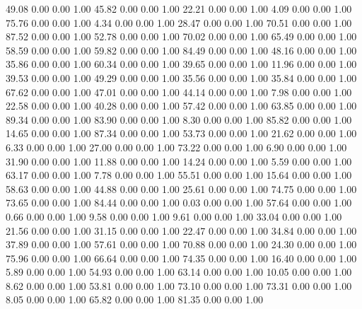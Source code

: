    49.08   0.00   0.00   1.00
   45.82   0.00   0.00   1.00
   22.21   0.00   0.00   1.00
    4.09   0.00   0.00   1.00
   75.76   0.00   0.00   1.00
    4.34   0.00   0.00   1.00
   28.47   0.00   0.00   1.00
   70.51   0.00   0.00   1.00
   87.52   0.00   0.00   1.00
   52.78   0.00   0.00   1.00
   70.02   0.00   0.00   1.00
   65.49   0.00   0.00   1.00
   58.59   0.00   0.00   1.00
   59.82   0.00   0.00   1.00
   84.49   0.00   0.00   1.00
   48.16   0.00   0.00   1.00
   35.86   0.00   0.00   1.00
   60.34   0.00   0.00   1.00
   39.65   0.00   0.00   1.00
   11.96   0.00   0.00   1.00
   39.53   0.00   0.00   1.00
   49.29   0.00   0.00   1.00
   35.56   0.00   0.00   1.00
   35.84   0.00   0.00   1.00
   67.62   0.00   0.00   1.00
   47.01   0.00   0.00   1.00
   44.14   0.00   0.00   1.00
    7.98   0.00   0.00   1.00
   22.58   0.00   0.00   1.00
   40.28   0.00   0.00   1.00
   57.42   0.00   0.00   1.00
   63.85   0.00   0.00   1.00
   89.34   0.00   0.00   1.00
   83.90   0.00   0.00   1.00
    8.30   0.00   0.00   1.00
   85.82   0.00   0.00   1.00
   14.65   0.00   0.00   1.00
   87.34   0.00   0.00   1.00
   53.73   0.00   0.00   1.00
   21.62   0.00   0.00   1.00
    6.33   0.00   0.00   1.00
   27.00   0.00   0.00   1.00
   73.22   0.00   0.00   1.00
    6.90   0.00   0.00   1.00
   31.90   0.00   0.00   1.00
   11.88   0.00   0.00   1.00
   14.24   0.00   0.00   1.00
    5.59   0.00   0.00   1.00
   63.17   0.00   0.00   1.00
    7.78   0.00   0.00   1.00
   55.51   0.00   0.00   1.00
   15.64   0.00   0.00   1.00
   58.63   0.00   0.00   1.00
   44.88   0.00   0.00   1.00
   25.61   0.00   0.00   1.00
   74.75   0.00   0.00   1.00
   73.65   0.00   0.00   1.00
   84.44   0.00   0.00   1.00
    0.03   0.00   0.00   1.00
   57.64   0.00   0.00   1.00
    0.66   0.00   0.00   1.00
    9.58   0.00   0.00   1.00
    9.61   0.00   0.00   1.00
   33.04   0.00   0.00   1.00
   21.56   0.00   0.00   1.00
   31.15   0.00   0.00   1.00
   22.47   0.00   0.00   1.00
   34.84   0.00   0.00   1.00
   37.89   0.00   0.00   1.00
   57.61   0.00   0.00   1.00
   70.88   0.00   0.00   1.00
   24.30   0.00   0.00   1.00
   75.96   0.00   0.00   1.00
   66.64   0.00   0.00   1.00
   74.35   0.00   0.00   1.00
   16.40   0.00   0.00   1.00
    5.89   0.00   0.00   1.00
   54.93   0.00   0.00   1.00
   63.14   0.00   0.00   1.00
   10.05   0.00   0.00   1.00
    8.62   0.00   0.00   1.00
   53.81   0.00   0.00   1.00
   73.10   0.00   0.00   1.00
   73.31   0.00   0.00   1.00
    8.05   0.00   0.00   1.00
   65.82   0.00   0.00   1.00
   81.35   0.00   0.00   1.00
